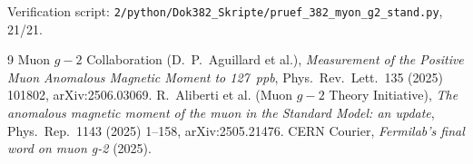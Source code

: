 \medskip\noindent Verification script: \texttt{2/python/Dok382\_Skripte/pruef\_382\_myon\_g2\_stand.py}, 21/21.

\begin{thebibliography}{9}
 Muon $g-2$ Collaboration (D.~P.~Aguillard et al.),
  \emph{Measurement of the Positive Muon Anomalous Magnetic Moment to 127~ppb},
  Phys.\ Rev.\ Lett.\ 135 (2025) 101802, arXiv:2506.03069.
 R.~Aliberti et al. (Muon $g-2$ Theory Initiative),
  \emph{The anomalous magnetic moment of the muon in the Standard Model: an update},
  Phys.\ Rep.\ 1143 (2025) 1--158, arXiv:2505.21476.
 CERN Courier, \emph{Fermilab's final word on muon g-2} (2025).
\end{thebibliography}
